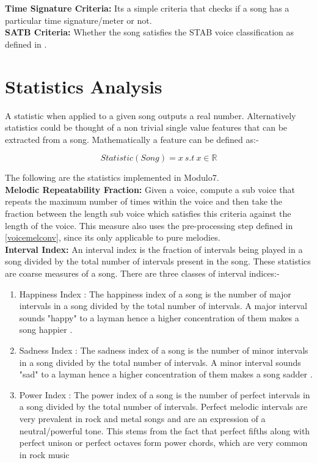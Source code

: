 \noindent \textbf{Time Signature Criteria:} Its a simple criteria that checks if a song has a particular time signature/meter or not. \\

\noindent \textbf{SATB Criteria:} Whether the song satisfies the STAB voice classification as defined in \cite{satbcriteria}. 

\section{Statistics Analysis} \label{statistic}

\noindent A statistic when applied to a given song outputs a real number. Alternatively statistics could be thought of a non trivial single value features that can be extracted from a song. Mathematically a feature can be defined as:-

\begin{equation}
Statistic(Song) = x \ s.t \ x \in \mathbb{R}
\end{equation}

\noindent The following are the statistics implemented in Modulo7. \\

\noindent \textbf{Melodic Repeatability Fraction: } Given a voice, compute a sub voice that repeats the maximum number of times within the voice and then take the fraction between the length sub voice which satisfies this criteria against the length of the voice. This measure also uses the pre-processing step defined in \ref{voicemelconv}, since its only applicable to pure melodies. \\

\noindent \textbf{Interval Index: } \label{intervals} An interval index is the fraction of intervals being played in a song divided by the total number of intervals present in the song. These statistics are coarse measures of a song. There are three classes of interval indices:-

\begin{enumerate}
\item Happiness Index : The happiness index of a song is the number of major intervals in a song divided by the total number of intervals. A major interval sounds "happy" to a layman hence a higher concentration of them makes a song happier \cite{majorvsminorintervals}. 
\item Sadness Index : The sadness index of a song is the number of minor intervals \cite{minorintervalssad}  in a song divided by the total number of intervals. A minor interval sounds "sad" to a layman hence a higher concentration of them makes a song sadder \cite{majorvsminorintervals}. 
\item Power Index : The power index of a song is the number of perfect intervals in a song divided by the total number of intervals. Perfect melodic intervals are very prevalent in rock and metal songs and are an expression of a neutral/powerful tone. This stems from the fact that perfect fifths along with perfect unison or perfect octaves form power chords, which are very common in rock music \cite{foundationsOfRock} 
\end{enumerate}

